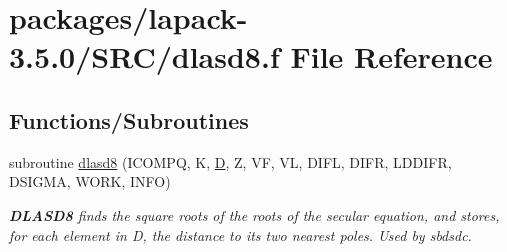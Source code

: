 \hypertarget{dlasd8_8f}{}\section{packages/lapack-\/3.5.0/\+S\+R\+C/dlasd8.f File Reference}
\label{dlasd8_8f}
\subsection*{Functions/\+Subroutines}
\begin{DoxyCompactItemize}
\item 
subroutine \hyperlink{group__auxOTHERauxiliary_gab80712d01afa9bb687bf87f10d0d2147}{dlasd8} (I\+C\+O\+M\+P\+Q, K, \hyperlink{odrpack_8h_a7dae6ea403d00f3687f24a874e67d139}{D}, Z, V\+F, V\+L, D\+I\+F\+L, D\+I\+F\+R, L\+D\+D\+I\+F\+R, D\+S\+I\+G\+M\+A, W\+O\+R\+K, I\+N\+F\+O)
\begin{DoxyCompactList}\small\item\em {\bfseries D\+L\+A\+S\+D8} finds the square roots of the roots of the secular equation, and stores, for each element in D, the distance to its two nearest poles. Used by sbdsdc. \end{DoxyCompactList}\end{DoxyCompactItemize}
